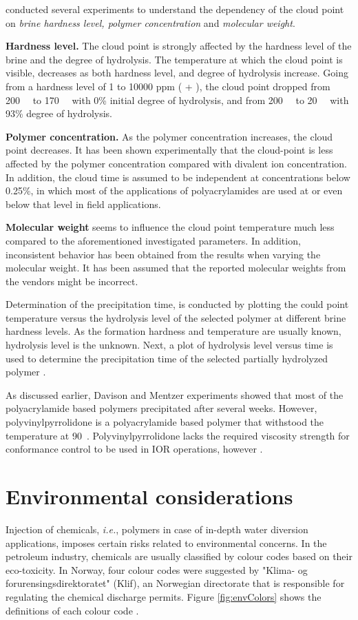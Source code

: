 \citet{Moradi1987} conducted several experiments to understand the dependency of the cloud point on \textit{brine hardness level, polymer concentration} and \textit{molecular weight}.

\textbf{Hardness level.}  The cloud point is strongly affected by the hardness level of the brine and the degree of hydrolysis. The temperature at which the cloud point is visible, decreases as both hardness level, and degree of hydrolysis increase. Going from a hardness level of 1 to 10000 ppm ( + ), the cloud point dropped from 200~\celsius~ to 170~\celsius~ with 0\% initial degree of hydrolysis, and from 200~\celsius~ to 20~\celsius~ with 93\% degree of hydrolysis.

\textbf{Polymer concentration.} As the polymer concentration increases, the cloud point decreases. It has been shown experimentally that the cloud-point is less affected by the polymer concentration compared with divalent ion concentration. In addition, the cloud time is assumed to be independent at concentrations below 0.25\%, in which most of the applications of polyacrylamides are used at or even below that level in field applications.

\textbf{Molecular weight} seems to influence the cloud point temperature much less compared to the aforementioned investigated parameters. In addition, inconsistent behavior has been obtained from the results when varying the molecular weight. It has been assumed that the reported molecular weights from the vendors might be incorrect.

Determination of the precipitation time, is conducted by plotting the could point temperature versus the hydrolysis level of the selected polymer at different brine hardness levels. As the formation hardness and temperature are usually known, hydrolysis level is the unknown. Next, a plot of hydrolysis level versus time is used to determine the precipitation time of the selected partially hydrolyzed polymer \citep{Moradi1987}.

As discussed earlier, Davison and Mentzer experiments showed that most of the polyacrylamide based polymers precipitated after several weeks. However, polyvinylpyrrolidone is a polyacrylamide based polymer that withstood the temperature at 90~\celsius. Polyvinylpyrrolidone lacks the required viscosity strength for conformance control to be used in IOR operations, however \citep{Stahl1988}.

\section{Environmental considerations} \label{sec:environmental}
Injection of chemicals,  \textit{i.e.}, polymers in case of in-depth water diversion applications, imposes certain risks related to environmental concerns. In the petroleum industry, chemicals are usually classified by colour codes based on their eco-toxicity. In Norway, four colour codes were suggested by "Klima- og forurensingsdirektoratet" (Klif), an Norwegian directorate that is responsible for regulating the chemical discharge permits. Figure \ref{fig:envColors} shows the definitions of each colour code \citep{Norskolje2018}.

